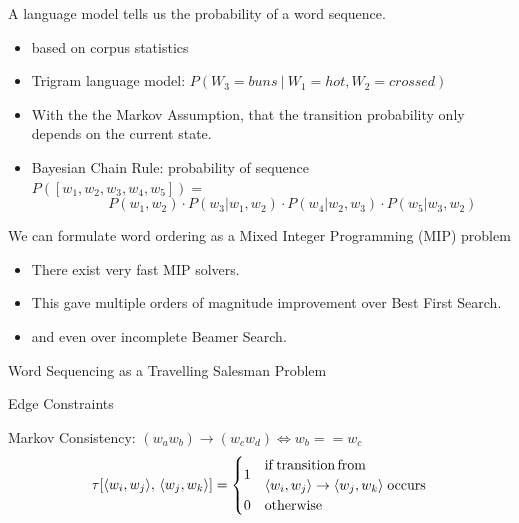\documentclass[]{beamer}
\newcommand{\fullwidthtikz}[1]{\resizebox{0.9\textwidth}{!}{
		\centering
		}}
\newcommand{\displayunskip}{\vspace{0pt}}
\begin{document}
\begin{frame}{A language model tells us the probability of a word sequence.}
	\begin{itemize}
		\item based on corpus statistics
		\item Trigram language model: $P(W_3=buns\:|\:W_1=hot, W_2=crossed)$
		\item With the the Markov Assumption, that the transition probability only depends on the current state.
		\pause
		\item Bayesian Chain Rule: probability of sequence \\$P([w_1,w_2,w_3,w_4,w_5])=$
		$$\qquad \quad P(w_1,w_2)\cdot P(w_3|w_1,w_2)\cdot P(w_4|w_2,w_3) \cdot P(w_5|w_3,w_2)$$
		
	\end{itemize}
	
\end{frame}


\begin{frame}{We can formulate word ordering as a Mixed Integer Programming (MIP) problem}
	\begin{itemize}
		\item There exist very fast MIP solvers.
		\item This gave multiple orders of magnitude improvement over Best First Search.
		\item and even over incomplete Beamer Search.
	\end{itemize}
\end{frame}

\begin{frame}{Word Sequencing as a Travelling Salesman Problem}
	\vspace{-1em}
	\fullwidthtikz{../figs/ordergraphpaper}
	 
\end{frame}

\begin{frame}{Edge Constraints}
	\vspace{-1em} 
	\fullwidthtikz{../figs/ordergraphpaper}
	
	\alert{Markov Consistency:} $(w_aw_b)\to (w_cw_d) \iff w_b==w_c$
	\displayunskip
	\begin{gather*}
	\tau[\langle w_{i},w_{j}\rangle,\,\langle w_{j},w_{k}\rangle] = %
	\begin{cases}
	\multirow{2}{*}{1} & \mathrm{if\,transition\,from} \\
	& \langle w_{i},w_{j}\rangle \to \langle w_{j},w_{k}\rangle
	\;\mathrm{ occurs} \\
	0  & \mathrm{otherwise}
	\end{cases}
	\end{gather*}
\end{frame}
\end{document}
